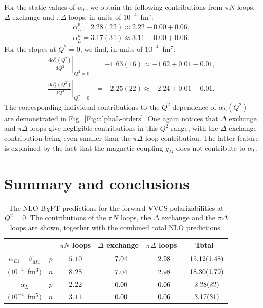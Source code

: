 \documentclass[11pt,preprint,tightenlines,
showpacs,preprintnumbers,amsmath,amssymb,superscriptaddress,a4paper,nofootinbib]{revtex4-1}
\def\hpm{\hphantom{-}}
\def\al{\alpha}
\def\dd{\mathrm{d}}
\begin{document}
For the static values of $\alpha_L$,
we obtain the following contributions from $\pi N$ loops,  $\Delta$ exchange and $\pi\Delta$ loops, in units of $10^{-4}$~fm$^5$:
\begin{align}
\alpha^p_L=2.28(22)\approx 2.22+ 0.00+  0.06, \\
\alpha^n_L= 3.17(31)\approx 3.11 + 0.00+ 0.06.
\end{align}
For the slopes at $Q^2=0$, we find, in units of $10^{-4}$~fm$^7$:
\begin{align}
\left.\frac{\dd\alpha^p_L (Q^2)}{\dd Q^2}\right|_{Q^2=0}&=-1.63(16)\approx  -1.62 + 0.01 - 0.01  ,  \\
\left.\frac{\dd\alpha^n_L (Q^2)}{\dd Q^2}\right|_{Q^2=0}&= -2.25(22)\approx -2.24 + 0.01 - 0.01.
\end{align}
 The corresponding individual contributions to the $Q^2$ dependence
of $\alpha_L(Q^2)$ are demonstrated in Fig.~\ref{Fig:alphaL-orders}. One again notices
that  $\Delta$ exchange and  $\pi \Delta$ loops give negligible contributions in this $Q^2$ range, with the $\Delta$-exchange contribution being even smaller than the $\pi \Delta$-loop contribution. 
The latter feature is explained by the fact that the magnetic coupling $g_M$ does not contribute to $\al_L$.







\section{Summary and conclusions}\label{Sec:Summary}


\begin{table}[h]
\caption{The NLO B$\chi$PT predictions for the forward VVCS polarizabilities at $Q^2=0$. The contributions of the $\pi N$ loops, the $\Delta$ exchange and the $\pi\Delta$ loops are shown, together with the combined total NLO predictions.
\label{Table:Individual-Results-Pol}}
\begin{tabular}{cc|c|c|c|c|}
\cline{3-6} 
&& $\pi N$ loops & $\Delta$ exchange   & $\pi\Delta$ loops & Total \\
\hline
\multicolumn{1}{|c||}{$\alpha_{E1}+\beta_{M1}$} &$p$&$5.10$&$\hpm7.04$&$\hpm2.98$&$\hpm15.12(1.48)$\\
\multicolumn{1}{|c||}{$(10^{-4}$~fm$^3)$} &$n$&$8.28$&$\hpm7.04$&$\hpm2.98$&$\hpm18.30(1.79)$\\
\hline
\multicolumn{1}{|c||}{$\alpha_L$}&$p$ &$2.22$&$\hpm0.00$&$\hpm0.06$&$\hpm2.28(22)$\\
\multicolumn{1}{|c||}{$(10^{-4}$~fm$^5)$} &$n$&$3.11$&$\hpm0.00$&$\hpm0.06$&$\hpm3.17(31)$\\
\hline
\end{tabular}
\end{table}
\end{document}

